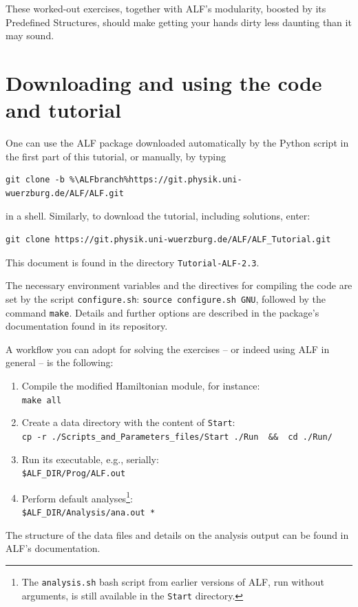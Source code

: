 \documentclass[10pt,modern]{scrartcl}
\numberwithin{exerciseitem}{exercise} %
\newcommand{\ALFver}{2.3}          %
\newcommand{\ALFbranch}{ALF-2.3}   %
\newcommand{\tutALFver}{2.3}       %
\begin{document}
These worked-out exercises, together with ALF's modularity, boosted by its Predefined Structures, should make getting your hands dirty less daunting than it may sound.


\section*{Downloading and using the code and tutorial}
One can use the ALF package downloaded automatically by the Python script in the first part of this tutorial, or manually, by typing
\begin{lstlisting}[style=bash,escapechar=\%]
git clone -b %\ALFbranch%https://git.physik.uni-wuerzburg.de/ALF/ALF.git
\end{lstlisting}
in a shell. Similarly, to download the tutorial, including solutions, enter:
\begin{lstlisting}[style=bash]
git clone https://git.physik.uni-wuerzburg.de/ALF/ALF_Tutorial.git
\end{lstlisting}
This document is found in the directory \texttt{Tutorial-ALF-\tutALFver{}}.

The necessary environment variables and the directives for compiling the code are set by the script \texttt{configure.sh}: \lstinline[style=bash]|source configure.sh GNU|, followed by the command  \lstinline[style=bash,morekeywords={make}]|make|. Details and further options are described in the package's documentation found in its repository.

A workflow you can adopt for solving the exercises -- or indeed using ALF in general -- is the following:
\begin{enumerate}
	\item Compile the modified Hamiltonian module, for instance:\\
	\lstinline[style=bash,morekeywords={make}]{make all}
	\item Create a data directory with the content of \texttt{Start}:\\
	\lstinline[style=bash,morekeywords={cp}]{cp -r ./Scripts_and_Parameters_files/Start ./Run  &&  cd ./Run/}
	\item Run its executable, e.g., serially:\\
	\lstinline[style=bash]{$ALF_DIR/Prog/ALF.out} %
	\item Perform default analyses\footnote{The \texttt{analysis.sh} bash script from earlier versions of ALF, run without arguments, is still available in the \texttt{Start} directory.}:\\
	\lstinline[style=bash]{$ALF_DIR/Analysis/ana.out *} %
\end{enumerate}
The structure of the data files and details on the analysis output can be found in ALF's documentation.
\end{document}
